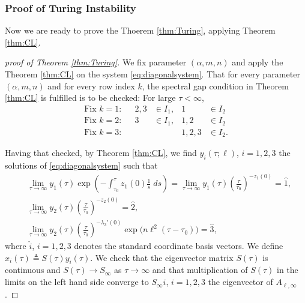 \documentclass[a4paper,11pt]{article}
\def\l{{\ell}}
\theoremstyle{remark}
\begin{document}
{\subsubsection{Proof of Turing Instability}
Now we are ready to prove the Thoerem \ref{thm:Turing}, applying Theorem \ref{thm:CL}.
\begin{proof}[proof of Theorem \ref{thm:Turing}]
We fix parameter $(\alpha,m,n)$ and apply the Theorem \ref{thm:CL} on the system \eqref{eq:diagonalsystem}. That for every parameter $(\alpha,m,n)$ and for every row index $k$, the spectral gap condition in Theorem \ref{thm:CL} is fulfilled is to be checked:
For large $\tau<\infty$,
\begin{align*}
  \text{Fix $k=1$:}&& 2,3&\in I_1, & 1&\in I_2\\
  \text{Fix $k=2$:}&& 3&\in I_1, & 1,2&\in I_2\\
  \text{Fix $k=3$:}&& & & 1,2,3&\in I_2.
\end{align*}

Having that checked, by Theorem \ref{thm:CL}, we find $y_i(\tau;\ell)$, $i=1,2,3$ the solutions of \eqref{eq:diagonalsystem} such that
 \begin{align*}
 &\lim_{\tau \rightarrow \infty} y_1(\tau) \exp\left(-\int_{\tau_0}^\tau z_1(0)\frac{1}{s}\; ds\right) = \lim_{\tau \rightarrow \infty} y_1(\tau)\left(\frac{\tau}{\tau_0}\right)^{-z_1(0)} = \hat{1}, \\
 &\lim_{\tau \rightarrow \infty} y_2(\tau)\left(\frac{\tau}{\tau_0}\right)^{-z_2(0)} = \hat{2}, \\
 &\lim_{\tau \rightarrow \infty} y_2(\tau)\left(\frac{\tau}{\tau_0}\right)^{-\lambda_3'(0)}\exp\Big(n\l^2(\tau-\tau_0)\Big) = \hat{3},
 \end{align*}
 where $\hat{i}$, $i=1,2,3$ denotes the standard coordinate basis vectors. We define $x_i(\tau)\triangleq S(\tau)y_i(\tau)$. We check that the eigenvector matrix $S(\tau)$ is continuous and $S(\tau) \rightarrow S_\infty$ as $\tau \rightarrow \infty$ and that multiplication of $S(\tau)$ in the limits on the left hand side converge to $S_\infty \hat{i}$, $i=1,2,3$ the eigenvector of $A_{\ell,\infty}$.


\end{proof}}
\end{document}
